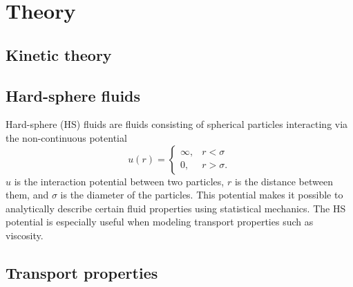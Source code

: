 \chapter{Theory}
\label{sec:theory}

\section{Kinetic theory}

\section{Hard-sphere fluids}
Hard-sphere (HS) fluids are fluids consisting of spherical particles 
interacting via the non-continuous potential 
\[
    \label{eq:hard_sphere_potential}
    u(r) = 
    \begin{cases}
        \infty, & r < \sigma \\
        0, & r > \sigma.
    \end{cases}
\]
$u$ is the interaction potential between two particles, 
$r$ is the distance between them, and $\sigma$ is 
the diameter of the particles. This potential makes 
it possible to analytically describe certain fluid 
properties using statistical mechanics. The HS 
potential is especially useful when modeling 
transport properties such as viscosity.


\section{Transport properties}


